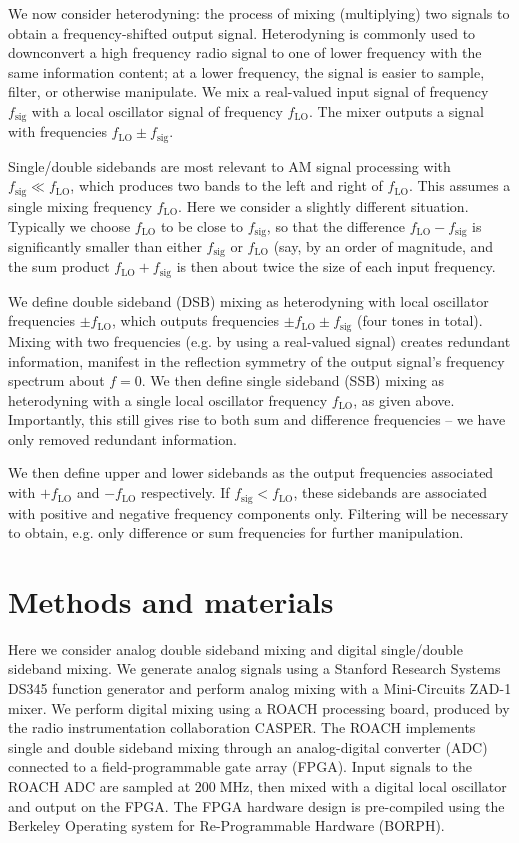 \documentclass[11pt]{article}
\newcommand {\mt}{\mathrm}
\newcommand {\unit}[1]{\; \mt{#1}}
\begin{document}
We now consider heterodyning: the process of mixing (multiplying) two signals
to obtain a frequency-shifted output signal.  Heterodyning is commonly used to
downconvert a high frequency radio signal to one of lower frequency with the
same information content; at a lower frequency, the signal is easier to sample,
filter, or otherwise manipulate.  We mix a real-valued input signal of
frequency $f_{\mt{sig}}$ with a local oscillator signal of frequency
$f_{\mt{LO}}$.  The mixer outputs a signal with frequencies $f_{\mt{LO}} \pm
f_{\mt{sig}}$.
 
Single/double sidebands are most relevant to AM signal processing with 
$f_{\mt{sig}} \ll f_{\mt{LO}}$, which produces two bands to the left and
right of $f_{\mt{LO}}$.  This assumes a single mixing frequency $f_{\mt{LO}}$.
Here we consider a slightly different situation.  Typically we choose
$f_{\mt{LO}}$ to be close to $f_{\mt{sig}}$, so that the difference
$f_{\mt{LO}} - f_{\mt{sig}}$ is significantly smaller than either
$f_{\mt{sig}}$ or $f_{\mt{LO}}$ (say, by an order of magnitude, and the sum
product $f_{\mt{LO}} + f_{\mt{sig}}$ is then about twice the size of each input
frequency.

We define double sideband (DSB) mixing as heterodyning with local oscillator
frequencies $\pm f_{\mt{LO}}$, which outputs frequencies $\pm f_{\mt{LO}} \pm
f_{\mt{sig}}$ (four tones in total).  Mixing with two frequencies (e.g. by
using a real-valued signal) creates redundant information, manifest in the
reflection symmetry of the output signal's frequency spectrum about $f = 0$.
We then define single sideband (SSB) mixing as heterodyning with a single local
oscillator frequency $f_{\mt{LO}}$, as given above.  Importantly, this still
gives rise to both sum and difference frequencies -- we have only removed
redundant information.

We then define upper and lower sidebands as the output frequencies
associated with $+f_{\mt{LO}}$ and $-f_{\mt{LO}}$ respectively.  If
$f_{\mt{sig}} < f_{\mt{LO}}$, these sidebands are associated with positive and
negative frequency components only.  Filtering will be necessary to obtain,
e.g. only difference or sum frequencies for further manipulation.

\section{Methods and materials}

Here we consider analog double sideband mixing and digital single/double
sideband mixing.  We generate analog signals using a Stanford Research Systems
DS345 function generator and perform analog mixing with a Mini-Circuits ZAD-1
mixer.  We perform digital mixing using a ROACH processing board, produced by 
the radio instrumentation collaboration CASPER.  The ROACH implements single
and double sideband mixing through an analog-digital converter (ADC) connected
to a field-programmable gate array (FPGA).  Input signals to the ROACH ADC are
sampled at $200 \unit{MHz}$, then mixed with a digital local oscillator and
output on the FPGA.  The FPGA hardware design is pre-compiled using the
Berkeley Operating system for Re-Programmable Hardware (BORPH).
\end{document}

